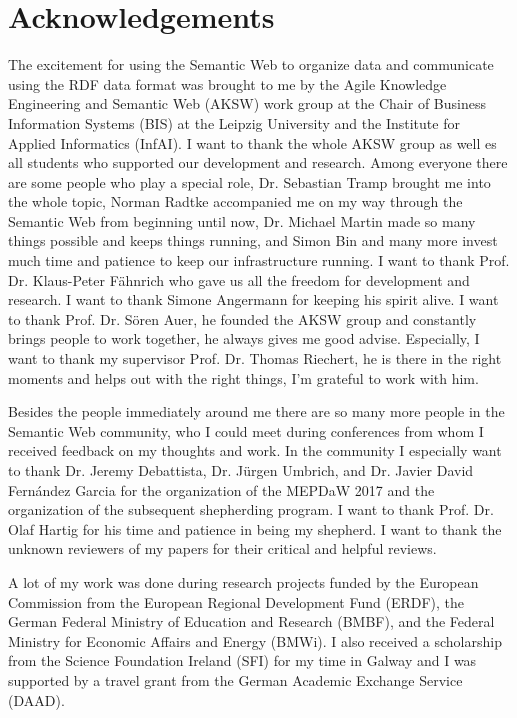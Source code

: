 \clearpage

\section*{Acknowledgements}
The excitement for using the Semantic Web to organize data and communicate using the RDF data format was brought to me by the Agile Knowledge Engineering and Semantic Web (AKSW) work group at the Chair of Business Information Systems (BIS) at the Leipzig University and the Institute for Applied Informatics (InfAI).
I want to thank the whole AKSW group as well es all students who supported our development and research.
Among everyone there are some people who play a special role, Dr. Sebastian Tramp brought me into the whole topic, Norman Radtke accompanied me on my way through the Semantic Web from beginning until now, Dr. Michael Martin made so many things possible and keeps things running, and Simon Bin and many more invest much time and patience to keep our infrastructure running.
I want to thank Prof. Dr. Klaus-Peter Fähnrich who gave us all the freedom for development and research.
I want to thank Simone Angermann for keeping his spirit alive.
I want to thank Prof. Dr. Sören Auer, he founded the AKSW group and constantly brings people to work together, he always gives me good advise.
Especially, I want to thank my supervisor Prof. Dr. Thomas Riechert, he is there in the right moments and helps out with the right things, I'm grateful to work with him.

Besides the people immediately around me there are so many more people in the Semantic Web community, who I could meet during conferences from whom I received feedback on my thoughts and work.
In the community I especially want to thank Dr. Jeremy Debattista, Dr. Jürgen Umbrich, and Dr. Javier David Fernández Garcia for the organization of the MEPDaW 2017 and the organization of the subsequent shepherding program.
I want to thank Prof. Dr. Olaf Hartig for his time and patience in being my shepherd.
I want to thank the unknown reviewers of my papers for their critical and helpful reviews.

A lot of my work was done during research projects funded by the European Commission from the European Regional Development Fund (ERDF), the German Federal Ministry of Education and Research (BMBF), and the Federal Ministry for Economic Affairs and Energy (BMWi).
I also received a scholarship from the Science Foundation Ireland (SFI) for my time in Galway and I was supported by a travel grant from the German Academic Exchange Service (DAAD).

